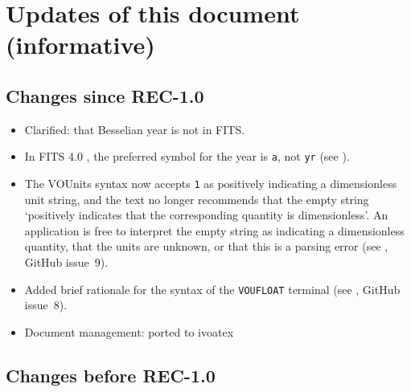 \documentclass[11pt,a4paper]{ivoa}
\newcommand{\unit}[1]{\texttt{\small\color{orange}#1}}
\begin{document}
\section{Updates of this document (informative)}

\subsection{Changes since REC-1.0}

\begin{itemize}
  \item Clarified: that Besselian year is not in FITS.
  \item In FITS 4.0 \citep{fits4}, the preferred symbol for the year is
    \unit{a}, not \unit{yr} (see ).
  \item The VOUnits syntax now accepts \unit{1} as positively
    indicating a dimensionless unit string, and the text no longer
    recommends that the empty string `positively indicates that the
    corresponding quantity is dimensionless'.  An application is free
    to interpret the empty string as indicating a dimensionless
    quantity, that the units are unknown, or that this is a parsing
    error (see , GitHub issue~9).
  \item Added brief rationale for the syntax of the \texttt{VOUFLOAT}
    terminal (see , GitHub issue~8).
  \item Document management: ported to ivoatex
\end{itemize}

\subsection{Changes before REC-1.0}
\end{document}
